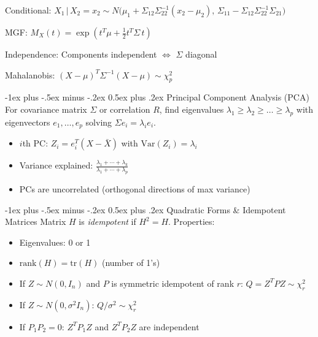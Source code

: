 \documentclass[6pt, landscape]{article}
\makeatletter
\renewcommand{\section}{\@startsection{section}{1}{0mm}%
                                {-1ex plus -.5ex minus -.2ex}%
                                {0.5ex plus .2ex}%
                                {\normalfont\bfseries}}
\makeatother
\begin{document}
\begin{multicols}{3}
        Conditional: $X_1\,|\,X_2=x_2 \sim N\big(\mu_1 + \Sigma_{12}\Sigma_{22}^{-1}(x_2-\mu_2),\, \Sigma_{11}-\Sigma_{12}\Sigma_{22}^{-1}\Sigma_{21}\big)$

        MGF: $M_X(t)=\exp(t^T \mu + \tfrac{1}{2}t^T \Sigma\,t)$

        \textcolor{formulacolor}{Independence}: Components independent $\iff$ $\Sigma$ diagonal

        Mahalanobis: $(X-\mu)^T\Sigma^{-1}(X-\mu)\sim \chi^2_p$

        \section{Principal Component Analysis (PCA)}
        For covariance matrix $\Sigma$ or correlation $R$, find eigenvalues $\lambda_1\ge\lambda_2\ge\dots\ge\lambda_p$ with eigenvectors $e_1,\dots,e_p$ solving $\Sigma e_i=\lambda_i e_i$.

        \begin{itemize}[leftmargin=*,topsep=0pt,itemsep=0pt]
                \item $i$th PC: $Z_i = e_i^T (X-\bar{X})$ with $\mathrm{Var}(Z_i)=\lambda_i$
                \item Variance explained: $\frac{\lambda_1+\cdots+\lambda_k}{\lambda_1+\cdots+\lambda_p}$
                \item PCs are uncorrelated (orthogonal directions of max variance)
        \end{itemize}

        \section{Quadratic Forms \& Idempotent Matrices}
        Matrix $H$ is \textit{idempotent} if $H^2=H$. Properties:
        \begin{itemize}[leftmargin=*,topsep=0pt,itemsep=0pt]
                \item Eigenvalues: 0 or 1
                \item $\mathrm{rank}(H)=\mathrm{tr}(H)$ (number of 1's)
                \item If $Z\sim N(0,I_n)$ and $P$ is symmetric idempotent of rank $r$: $Q=Z^T P Z \sim \chi^2_r$
                \item If $Z\sim N(0,\sigma^2 I_n)$: $Q/\sigma^2 \sim \chi^2_r$
                \item If $P_1P_2 = 0$: $Z^T P_1 Z$ and $Z^T P_2 Z$ are independent
        \end{itemize}


\end{multicols}
\end{document}
